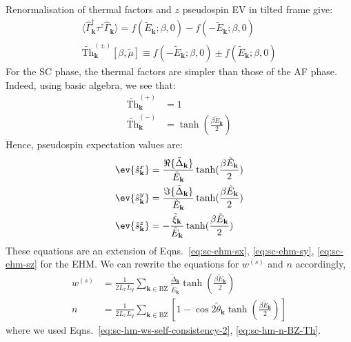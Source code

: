 Renormalisation of thermal factors and $z$ pseudospin EV in tilted frame give:
\begin{align}
	\langle \hat \Gamma_\mathbf{k}^\dagger \tau^z \hat \Gamma_\mathbf{k} \rangle = 
	f\left(
		\tilde{E}_\mathbf{k};\beta,0
	\right) - f\left(
		-\tilde{E}_\mathbf{k};\beta,0
	\right) \label{eq:sc-<~z>} \\
	\tilde{\mathrm{Th}}_\mathbf{k}^{(\pm)}[\beta,\tilde{\mu}] \equiv
	f\left(
		-\tilde{E}_\mathbf{k};\beta,0
	\right) \pm f\left(
		\tilde{E}_\mathbf{k};\beta,0
	\right) \label{eq:sc-~Th}
\end{align}
For the SC phase, the thermal factors are simpler than those of the AF phase. Indeed, using basic algebra, we see that:
\begin{align}
	\tilde{\mathrm{Th}}_\mathbf{k}^{(+)} &= 1 \label{eq:sc-Th+=1} \\
	\tilde{\mathrm{Th}}_\mathbf{k}^{(-)} &= \tanh(\frac{\beta \tilde{E}_\mathbf{k}}{2}) \label{eq:sc-Th-=tanh}
\end{align}
Hence, pseudospin expectation values are:
\begin{align}
	\ev{\hat s_\mathbf{k}^x} &= \frac{\Re \lbrace \tilde{\Delta}_\mathbf{k} \rbrace}{\tilde{E}_\mathbf{k}} \tanh(\frac{\beta \tilde{E}_\mathbf{k}}{2}) \label{eq:sc-ehm-sx} \\
	\ev{\hat s_\mathbf{k}^y} &= \frac{\Im \lbrace \tilde{\Delta}_\mathbf{k} \rbrace}{\tilde{E}_\mathbf{k}} \tanh(\frac{\beta \tilde{E}_\mathbf{k}}{2}) \label{eq:sc-ehm-sy}\\
	\ev{\hat s_\mathbf{k}^z} &=  -\frac{\tilde{\xi}_\mathbf{k}}{\tilde{E}_\mathbf{k}} \tanh(\frac{\beta \tilde{E}_\mathbf{k}}{2}) \label{eq:sc-ehm-sz}
\end{align}
These equations are an extension of Eqns.~\eqref{eq:sc-ehm-sx}, \eqref{eq:sc-ehm-sy}, \eqref{eq:sc-ehm-sz} for the EHM. We can rewrite the equations for $w^{(s)}$ and $n$ accordingly,
\begin{align}
	w^{(s)} &= \frac{1}{2L_x L_y} \sum_{\mathbf{k} \in \mathrm{BZ}} \frac{\tilde{\Delta}_\mathbf{k}}{\tilde{E}_\mathbf{k}} \tanh(\frac{\beta \tilde{E}_\mathbf{k}}{2})
	\label{eq:sc-ehm-ws-self-consistency} \\
	n &= \frac{1}{2L_x L_y} \sum_{\mathbf{k} \in \mathrm{BZ}} \left[
	1 - \cos 2\tilde{\theta}_\mathbf{k} \tanh(\frac{\beta \tilde{E}_\mathbf{k}}{2})
	\right] \label{eq:sc-ehm-n-BZ-Th}
\end{align}
where we used Eqns.~\eqref{eq:sc-hm-ws-self-consistency-2}, \eqref{eq:sc-hm-n-BZ-Th}. 

